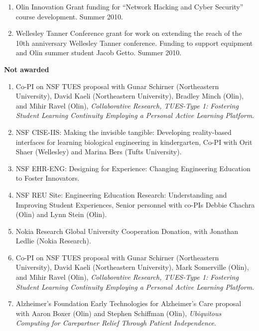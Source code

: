 \documentclass[line]{res}
\begin{document}
\begin{resume}
\begin{enumerate}
		\item Olin Innovation Grant funding for ``Network Hacking and Cyber Security'' course development. Summer 2010.
		
		\item Wellesley Tanner Conference grant for work on extending the reach of the 10th anniversary Wellesley Tanner conference. Funding to support equipment and Olin summer student Jacob Getto. Summer 2010.
	\end{enumerate}
	
	\textbf{Not awarded} 
	\begin{enumerate}
		\item Co-PI on NSF TUES proposal with Gunar Schirner (Northeastern University), David Kaeli (Northeastern University), Bradley Minch (Olin), and Mihir Ravel (Olin), \textit{Collaborative Research, TUES-Type 1: Fostering Student Learning Continuity Employing a Personal Active Learning Platform}. 
		
		\item NSF CISE-IIS: Making the invisible tangible: Developing reality-based interfaces for learning biological engineering in kindergarten, Co-PI with Orit Shaer (Wellesley) and Marina Bers (Tufts University).
		
		\item NSF EHR-ENG: Designing for Experience: Changing Engineering Education to Foster Innovators.
		
		\item NSF REU Site: Engineering Education Research: Understanding and Improving Student Experiences, Senior personnel with co-PIs Debbie Chachra (Olin) and Lynn Stein (Olin).
		
		\item Nokia Research Global University Cooperation Donation, with Jonathan Ledlie (Nokia Research).
		
		\item Co-PI on NSF TUES proposal with Gunar Schirner (Northeastern University), David Kaeli (Northeastern University), Mark Somerville (Olin), and Mihir Ravel (Olin), \textit{Collaborative Research, TUES-Type 1: Fostering Student Learning Continuity Employing a Personal Active Learning Platform}. 

		\item Alzheimer's Foundation Early Technologies for Alzheimer's Care proposal with Aaron Boxer (Olin) and Stephen Schiffman (Olin), \textit{Ubiquitous Computing for Carepartner Relief Through Patient Independence}. 


\end{enumerate}
\end{resume}
\end{document}
